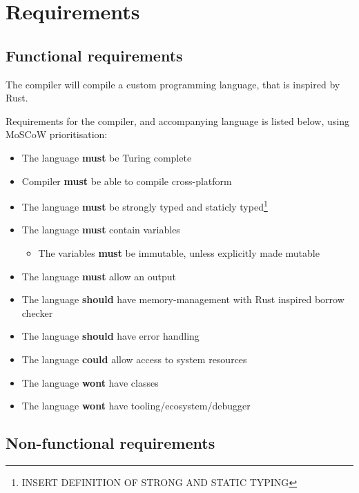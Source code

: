\newpage
\section{Requirements}

\subsection{Functional requirements}
The compiler will compile a custom programming language, that is inspired by Rust.

Requirements for the compiler, and accompanying language is listed below, using MoSCoW prioritisation:

\begin{itemize}
\item The language \textbf{must} be Turing complete 
\item Compiler \textbf{must} be able to compile cross-platform
\item The language \textbf{must} be strongly typed and staticly typed\footnote{INSERT DEFINITION OF STRONG AND STATIC TYPING}
\item The language \textbf{must} contain variables
\begin{itemize}
\item The variables \textbf{must} be immutable, unless explicitly made mutable
\end{itemize}
\item The language \textbf{must} allow an output
\item The language \textbf{should} have memory-management with Rust inspired borrow checker
\item The language \textbf{should} have error handling
\item The language \textbf{could} allow access to system resources
\item The language \textbf{wont} have classes
\item The language \textbf{wont} have tooling/ecosystem/debugger
\end{itemize}

\subsection{Non-functional requirements}



